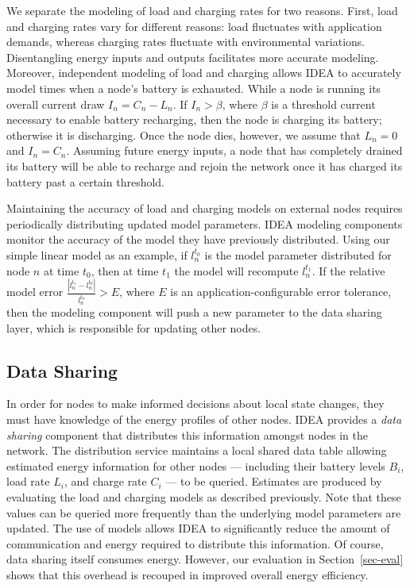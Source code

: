 \documentclass{sig-alternate}
\begin{document}
We separate the modeling of load and charging rates for two reasons. First,
load and charging rates vary for different reasons: load fluctuates with
application demands, whereas charging rates fluctuate with environmental
variations. Disentangling energy inputs and outputs facilitates more accurate
modeling. Moreover, independent modeling of load and charging allows IDEA to
accurately model times when a node's battery is exhausted. While a node is
running its overall current draw $I_n = C_n - L_n$. If $I_n > \beta$, where
$\beta$ is a threshold current necessary to enable battery recharging, then
the node is charging its battery; otherwise it is discharging. Once the node
dies, however, we assume that $L_n = 0$ and $I_n = C_n$. Assuming future
energy inputs, a node that has completely drained its battery will be able to
recharge and rejoin the network once it has charged its battery past a
certain threshold.

Maintaining the accuracy of load and charging models on external nodes
requires periodically distributing updated model parameters. IDEA modeling
components monitor the accuracy of the model they have previously
distributed. Using our simple linear model as an example, if $l_n^{t_0}$ is
the model parameter distributed for node $n$ at time $t_0$, then at time
$t_1$ the model will recompute $l_n^{t_1}$. If the relative model error
$\frac{\left| l_n^{t_1} - l_n^{t_0} \right|}{l_n^{t_0}} > E$, where $E$ is an
application-configurable error tolerance, then the modeling component will
push a new parameter to the data sharing layer, which is responsible for
updating other nodes. 

\subsection{Data Sharing}

In order for nodes to make informed decisions about local state changes, they
must have knowledge of the energy profiles of other nodes. IDEA provides a
\textit{data sharing} component that distributes this information amongst
nodes in the network. The distribution service maintains a local shared data
table allowing estimated energy information for other nodes --- including
their battery levels $B_i$, load rate $L_i$, and charge rate $C_i$ --- to be
queried. Estimates are produced by evaluating the load and charging models as
described previously. Note that these values can be queried more frequently
than the underlying model parameters are updated. The use of models allows
IDEA to significantly reduce the amount of communication and energy required
to distribute this information. Of course, data sharing itself consumes
energy. However, our evaluation in Section~\ref{sec-eval} shows that this
overhead is recouped in improved overall energy efficiency. 
\end{document}
